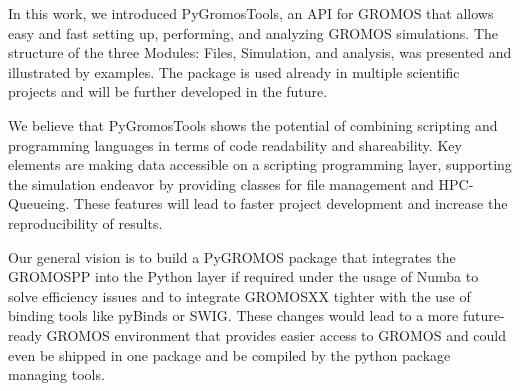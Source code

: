 In this work, we introduced PyGromosTools, an API for GROMOS that allows easy and fast setting up, performing, and analyzing GROMOS simulations. The structure of the three Modules: Files, Simulation, and analysis, was presented and illustrated by examples. 
The package is used already in multiple scientific projects and will be further developed in the future. 

We believe that PyGromosTools shows the potential of combining scripting and programming languages in terms of code readability and shareability. Key elements are making data accessible on a scripting programming layer, supporting the simulation endeavor by providing classes for file management and HPC-Queueing.
These features will lead to faster project development and increase the reproducibility of results.  

Our general vision is to build a PyGROMOS package that integrates the GROMOSPP \cite{Eichenberger2011} into the Python layer if required under the usage of Numba to solve efficiency issues and to integrate GROMOSXX \cite{Schmid2012} tighter with the use of binding tools like pyBinds or SWIG. \cite{Wenzel2011, Beazley1996} These changes would lead to a more future-ready GROMOS environment that provides easier access to GROMOS and could even be shipped in one package and be compiled by the python package managing tools. 